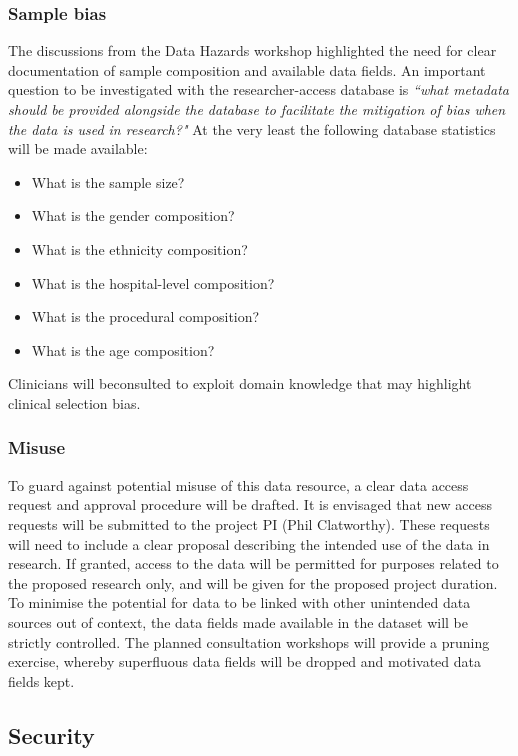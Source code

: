 \documentclass{article}
\begin{document}
\subsubsection{Sample bias}
The discussions from the Data Hazards workshop highlighted the need
for clear documentation of sample composition and available data
fields. An important question to be investigated with the
researcher-access database is \textit{``what metadata should be provided
  alongside the database to facilitate the mitigation of bias when the
  data is used in research?"} At the very least the following
database statistics will be made available:
\begin{itemize}
\item What is the sample size?
\item What is the gender composition?
\item What is the ethnicity composition?
\item What is the hospital-level composition?
\item What is the procedural composition?
\item What is the age composition?
\end{itemize}

\noindent Clinicians will beconsulted to exploit domain knowledge that may highlight clinical
selection bias.


\subsubsection{Misuse}

To guard against potential misuse of this data resource, a clear data
access request and approval procedure will be drafted. It is envisaged
that new access requests will be submitted to the project PI (Phil
Clatworthy). These requests will need to include a clear proposal
describing the intended use of the data in research. If granted, access to the
data will be permitted for purposes related to the proposed research
only, and will be given for the proposed project duration.\\

To minimise the potential for data to be linked with other unintended data
sources out of context, the data fields made available in the dataset
will be strictly controlled. The planned consultation workshops will
provide a pruning exercise, whereby superfluous data fields will be
dropped and motivated data fields kept. \\

\subsection{Security}
\end{document}
